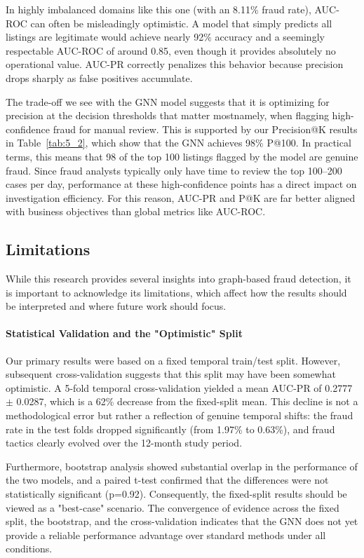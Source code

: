 In highly imbalanced domains like this one (with an 8.11\% fraud rate), AUC-ROC can often be misleadingly optimistic. A model that simply predicts all listings are legitimate would achieve nearly 92\% accuracy and a seemingly respectable AUC-ROC of around 0.85, even though it provides absolutely no operational value. AUC-PR correctly penalizes this behavior because precision drops sharply as false positives accumulate.

The trade-off we see with the GNN model suggests that it is optimizing for precision at the decision thresholds that matter mostnamely, when flagging high-confidence fraud for manual review. This is supported by our Precision@K results in Table~\ref{tab:5_2}, which show that the GNN achieves 98\% P@100. In practical terms, this means that 98 of the top 100 listings flagged by the model are genuine fraud. Since fraud analysts typically only have time to review the top 100–200 cases per day, performance at these high-confidence points has a direct impact on investigation efficiency. For this reason, AUC-PR and P@K are far better aligned with business objectives than global metrics like AUC-ROC.

\subsection{Limitations}
\label{sec:5_10_2}

While this research provides several insights into graph-based fraud detection, it is important to acknowledge its limitations, which affect how the results should be interpreted and where future work should focus.

\paragraph{Statistical Validation and the "Optimistic" Split}

Our primary results were based on a fixed temporal train/test split. However, subsequent cross-validation suggests that this split may have been somewhat optimistic. A 5-fold temporal cross-validation yielded a mean AUC-PR of 0.2777 $\pm$ 0.0287, which is a 62\% decrease from the fixed-split mean. This decline is not a methodological error but rather a reflection of genuine temporal shifts: the fraud rate in the test folds dropped significantly (from 1.97\% to 0.63\%), and fraud tactics clearly evolved over the 12-month study period.

Furthermore, bootstrap analysis showed substantial overlap in the performance of the two models, and a paired t-test confirmed that the differences were not statistically significant (p=0.92). Consequently, the fixed-split results should be viewed as a "best-case" scenario. The convergence of evidence across the fixed split, the bootstrap, and the cross-validation indicates that the GNN does not yet provide a reliable performance advantage over standard methods under all conditions.

